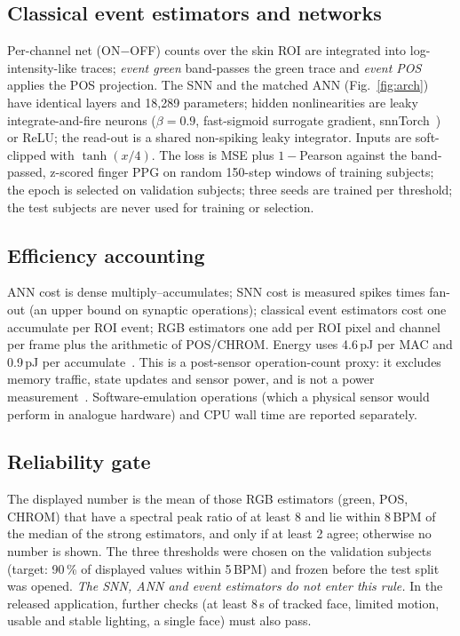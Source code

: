 \documentclass[10pt,journal]{IEEEtran}
\begin{document}
\subsection{Classical event estimators and networks}
Per-channel net (ON$-$OFF) counts over the skin ROI are integrated into log-intensity-like traces; \emph{event green} band-passes the green trace and \emph{event POS} applies the POS projection. The SNN and the matched ANN (Fig.~\ref{fig:arch}) have identical layers and 18,289 parameters; hidden nonlinearities are leaky integrate-and-fire neurons ($\beta=0.9$, fast-sigmoid surrogate gradient, snnTorch~\cite{eshraghian2023snntorch}) or ReLU; the read-out is a shared non-spiking leaky integrator. Inputs are soft-clipped with $\tanh(x/4)$. The loss is MSE plus $1-$Pearson against the band-passed, z-scored finger PPG on random 150-step windows of training subjects; the epoch is selected on validation subjects; three seeds are trained per threshold; the test subjects are never used for training or selection.
\subsection{Efficiency accounting}
ANN cost is dense multiply--accumulates; SNN cost is measured spikes times fan-out (an upper bound on synaptic operations); classical event estimators cost one accumulate per ROI event; RGB estimators one add per ROI pixel and channel per frame plus the arithmetic of POS/CHROM. Energy uses 4.6\,pJ per MAC and 0.9\,pJ per accumulate~\cite{horowitz2014energy}. This is a post-sensor operation-count proxy: it excludes memory traffic, state updates and sensor power, and is not a power measurement~\cite{dampfhoffer2023,lemaire2022}. Software-emulation operations (which a physical sensor would perform in analogue hardware) and CPU wall time are reported separately.
\subsection{Reliability gate}
The displayed number is the mean of those RGB estimators (green, POS, CHROM) that have a spectral peak ratio of at least 8 and lie within 8\,BPM of the median of the strong estimators, and only if at least 2 agree; otherwise no number is shown. The three thresholds were chosen on the validation subjects (target: 90\,\% of displayed values within 5\,BPM) and frozen before the test split was opened. \emph{The SNN, ANN and event estimators do not enter this rule.} In the released application, further checks (at least 8\,s of tracked face, limited motion, usable and stable lighting, a single face) must also pass.
\end{document}
